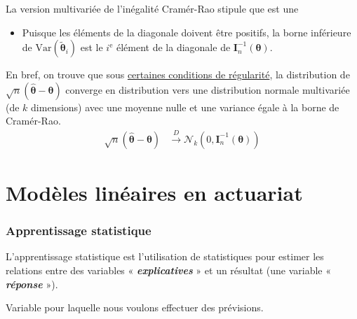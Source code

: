\documentclass[10pt, french]{article}
\begin{document}
\begin{multicols*}{2}
La version multivariée de l'inégalité Cramér-Rao stipule que  est une 
\begin{itemize}
	\item	Puisque les éléments de la diagonale doivent être positifs, la borne inférieure de $\text{Var}(\tilde{\bm{\theta}}_{i})$ est le $i^{\text{e}}$ élément de la diagonale de $\bm{I}^{-1}_{n}(\bm{\theta})$.
\end{itemize}
	
En bref, on trouve que sous \hyperlink{reg_cond}{\color{blue!40!green!80!black}certaines conditions de régularité}, la distribution de $\sqrt{n}\left( \hat{\bm{\theta}}	-	\bm{\theta} \right)$ converge en distribution vers une distribution normale multivariée (de $k$ dimensions) avec une moyenne nulle et une variance égale à la borne de Cramér-Rao.
\begin{align*}
	\sqrt{n}\left( \hat{\bm{\theta}}	-	\bm{\theta} \right)
	&\overset{D}{\rightarrow}
	\mathcal{N}_{k}\left( 0, \bm{I}^{-1}_{n}(\bm{\theta}) \right)
\end{align*}



\pagebreak

\part{Modèles linéaires en actuariat}
\label{chapt:modLin}
\section{Apprentissage statistique}
\begin{definitionNOHFILL}
L'apprentissage statistique est l'utilisation de statistiques pour estimer les relations entre des variables « \textit{\textbf{explicatives}} » et un résultat (une variable « \textbf{\textit{réponse}} »). 
\end{definitionNOHFILL}

\begin{definitionNOHFILLsub}
Variable pour laquelle nous voulons effectuer des prévisions.
\end{definitionNOHFILLsub}


\end{multicols*}
\end{document}

